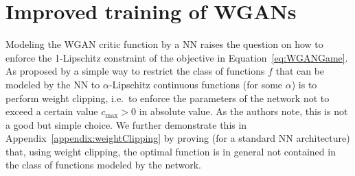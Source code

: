 \documentclass{article} %
\newcommand{\norm}[1]{||{#1}||_2}
\newtheorem{lemma}{Lemma}
\begin{document}


\section{Improved training of WGANs}\label{sec:iWGAN}


Modeling the WGAN critic function by a NN raises the question on how to enforce the 1-Lipschitz constraint of  the objective in Equation~\eqref{eq:WGANGame}. 
%
As proposed by \citet{WGAN} a simple way to restrict the class of functions $f$ that can be modeled by the NN to $\alpha$-Lipschitz continuous functions (for some $\alpha$) is to perform weight clipping, i.e.~to enforce the parameters of the network not to exceed a certain value $c_{\text{max}}>0$ in absolute value. As the authors note, this is not a good but simple choice. We further demonstrate this in Appendix~\ref{appendix:weightClipping} by proving (for a standard NN architecture) that, using weight clipping, the optimal function is in general not contained in the class of functions modeled by the network.
\end{document}
